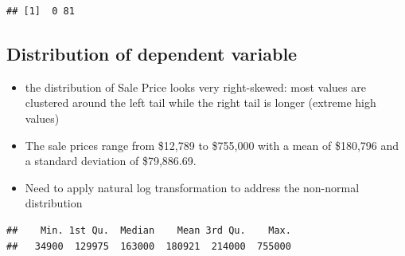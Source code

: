 \documentclass[aoas]{imsart}
\newenvironment{Shaded}{\begin{snugshade}}{\end{snugshade}}
\newcommand{\AttributeTok}[1]{\textcolor[rgb]{0.77,0.63,0.00}{#1}}
\newcommand{\ConstantTok}[1]{\textcolor[rgb]{0.00,0.00,0.00}{#1}}
\newcommand{\DecValTok}[1]{\textcolor[rgb]{0.00,0.00,0.81}{#1}}
\newcommand{\FunctionTok}[1]{\textcolor[rgb]{0.00,0.00,0.00}{#1}}
\newcommand{\NormalTok}[1]{#1}
\newcommand{\SpecialCharTok}[1]{\textcolor[rgb]{0.00,0.00,0.00}{#1}}
\newcommand{\StringTok}[1]{\textcolor[rgb]{0.31,0.60,0.02}{#1}}
\providecommand{\tightlist}{%
  \setlength{\itemsep}{0pt}\setlength{\parskip}{0pt}}
\numberwithin{equation}{section}
\theoremstyle{plain}
\theoremstyle{remark}
\begin{document}
\begin{verbatim}
## [1]  0 81
\end{verbatim}

\hypertarget{distribution-of-dependent-variable}{%
\subsection{Distribution of dependent
variable}\label{distribution-of-dependent-variable}}

\begin{itemize}
\tightlist
\item
  the distribution of Sale Price looks very right-skewed: most values
  are clustered around the left tail while the right tail is longer
  (extreme high values)
\item
  The sale prices range from \$12,789 to \$755,000 with a mean of
  \$180,796 and a standard deviation of \$79,886.69.
\item
  Need to apply natural log transformation to address the non-normal
  distribution
\end{itemize}

\begin{Shaded}
\end{Shaded}

\begin{verbatim}
##    Min. 1st Qu.  Median    Mean 3rd Qu.    Max. 
##   34900  129975  163000  180921  214000  755000
\end{verbatim}

\begin{Shaded}
\end{Shaded}
\end{document}
